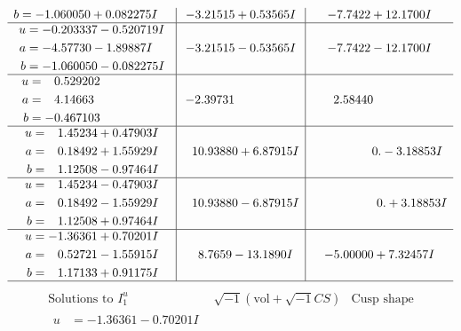 \documentclass[1p]{elsarticle_modified}
\theoremstyle{definition}
\newcommand{\I}{\sqrt{-1}}
\begin{document}
$$\begin{array}{c|c|c}
\begin{aligned}
b &= -1.060050 + 0.082275 I\end{aligned}
 & -3.21515 + 0.53565 I & -7.7422 + 12.1700 I \\ \hline\begin{aligned}
u &= -0.203337 - 0.520719 I \\
a &= -4.57730 - 1.89887 I \\
b &= -1.060050 - 0.082275 I\end{aligned}
 & -3.21515 - 0.53565 I & -7.7422 - 12.1700 I \\ \hline\begin{aligned}
u &= \phantom{-}0.529202\phantom{ +0.000000I} \\
a &= \phantom{-}4.14663\phantom{ +0.000000I} \\
b &= -0.467103\phantom{ +0.000000I}\end{aligned}
 & -2.39731\phantom{ +0.000000I} & \phantom{-}2.58440\phantom{ +0.000000I} \\ \hline\begin{aligned}
u &= \phantom{-}1.45234 + 0.47903 I \\
a &= \phantom{-}0.18492 + 1.55929 I \\
b &= \phantom{-}1.12508 - 0.97464 I\end{aligned}
 & \phantom{-}10.93880 + 6.87915 I & \phantom{-0.000000 } 0. - 3.18853 I \\ \hline\begin{aligned}
u &= \phantom{-}1.45234 - 0.47903 I \\
a &= \phantom{-}0.18492 - 1.55929 I \\
b &= \phantom{-}1.12508 + 0.97464 I\end{aligned}
 & \phantom{-}10.93880 - 6.87915 I & \phantom{-0.000000 -}0. + 3.18853 I \\ \hline\begin{aligned}
u &= -1.36361 + 0.70201 I \\
a &= \phantom{-}0.52721 - 1.55915 I \\
b &= \phantom{-}1.17133 + 0.91175 I\end{aligned}
 & \phantom{-}8.7659 - 13.1890 I & -5.00000 + 7.32457 I\\
 \hline 
 \end{array}$$\newpage$$\begin{array}{c|c|c}  
\text{Solutions to }I^u_{1}& \I (\text{vol} + \sqrt{-1}CS) & \text{Cusp shape}\\
 \hline 
\begin{aligned}
u &= -1.36361 - 0.70201 I \\

\end{aligned}
\end{array}$$
\end{document}
